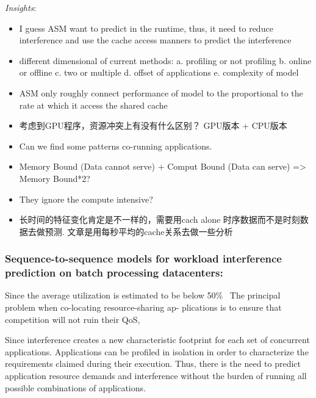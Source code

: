 \documentclass[UTF8]{article}
\begin{document}
    
    \emph{Insights}: 
    \begin{itemize}
    
        \item I guess ASM want to predict in the runtime, thus, it need to reduce interference and use the cache access manners to predict the interference 
    
        \item different dimensional of current methods: a. profiling or not profiling b. online or offline c. two or multiple d. offset of applications e. complexity of model 
    
        \item ASM only roughly connect performance of model to the proportional to the rate at which it access the shared cache 
    
        \item 考虑到GPU程序，资源冲突上有没有什么区别？ GPU版本 + CPU版本 
    
        \item Can we find some patterns co-running applications. 
    
        \item Memory Bound (Data cannot serve) + Comput Bound (Data can serve) => Memory Bound*2? 
    
        \item They ignore the compute intensive?
    
        \item 长时间的特征变化肯定是不一样的，需要用cach alone 时序数据而不是时刻数据去做预测. 文章是用每秒平均的cache关系去做一些分析
        
    \end{itemize}
    
    \subsubsection{Sequence-to-sequence models for workload interference prediction on batch processing datacenters:}
    
    Since the average utilization is estimated to be below 50\%~\cite{barroso2007case, reiss2012heterogeneity} The principal problem when co-locating resource-sharing ap- plications is to ensure that competition will not ruin their QoS,
    
    Since interference creates a new characteristic footprint for each set of concurrent applications. Applications can be profiled in isolation in order to characterize the requirements claimed during their execution. Thus, there is the need to predict application resource demands and interference without the burden of running all possible combinations of applications.
    
\end{document}

